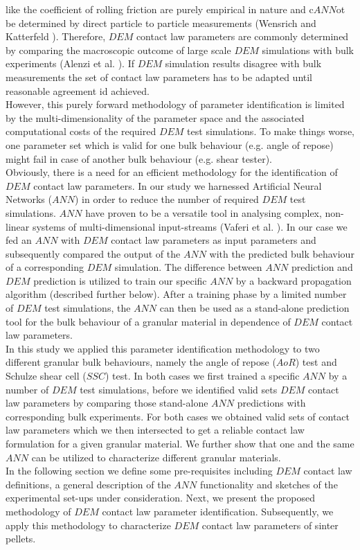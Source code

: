 like the coefficient of rolling friction are purely empirical in nature and c$ANN$ot be 
determined by direct particle to particle measurements (Wensrich and Katterfeld \cite{RefWorks:87}). 
Therefore, $DEM$ contact law parameters are commonly determined by comparing the macroscopic outcome 
of large scale $DEM$ simulations with bulk experiments (Alenzi et al. \cite{RefWorks:91}). 
If $DEM$ simulation results disagree with bulk measurements the set of contact law parameters 
has to be adapted until reasonable agreement id achieved.\\
However, this purely forward methodology of parameter identification is limited by 
the multi-dimensionality of the parameter space and the associated computational costs of the required $DEM$ test simulations. 
To make things worse, one parameter set which is valid for one bulk behaviour (e.g. angle of repose) 
might fail in case of another bulk behaviour (e.g. shear tester). \\
Obviously, there is a need for an efficient methodology for the identification of $DEM$ contact law parameters. 
In our study we harnessed Artificial Neural Networks ($ANN$) in order to reduce the number of required $DEM$ test simulations. 
$ANN$ have proven to be a versatile tool in analysing complex, non-linear systems of 
multi-dimensional input-streams (Vaferi et al. \cite{RefWorks:150}). 
In our case we fed an $ANN$ with $DEM$ contact law parameters as input parameters and 
subsequently compared the output of the $ANN$ with the predicted bulk behaviour of a corresponding $DEM$ simulation. 
The difference between $ANN$ prediction and $DEM$ prediction is utilized to train our 
specific $ANN$ by a backward propagation algorithm (described further below). 
After a training phase by a limited number of $DEM$ test simulations, the $ANN$ can then be 
used as a stand-alone prediction tool for the bulk behaviour of a granular material in dependence of $DEM$ contact law parameters. \\
In this study we applied this parameter identification methodology to two different granular bulk behaviours, 
namely the angle of repose ($AoR$) test and Schulze shear cell ($SSC$) test. 
In both cases we first trained a specific $ANN$ by a number of $DEM$ test simulations, 
before we identified valid sets $DEM$ contact law parameters by comparing those 
stand-alone $ANN$ predictions with corresponding bulk experiments. 
For both cases we obtained valid sets of contact law parameters 
which we then intersected to get a reliable contact law formulation for a given granular material. 
We further show that one and the same $ANN$ can be utilized to characterize different granular materials. \\
In the following section we define some pre-requisites including $DEM$ contact law definitions, 
a general description of the $ANN$ functionality and sketches of the experimental set-ups under consideration. 
Next, we present the proposed methodology of $DEM$ contact law parameter identification. 
Subsequently, we apply this methodology to characterize $DEM$ contact law parameters of sinter pellets.

